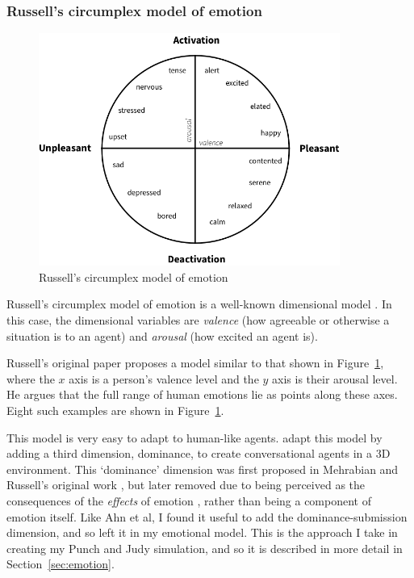 \documentclass[11pt]{report}
\begin{document}
\subsubsection{Russell's circumplex model of emotion}\label{sec:circumplex}
\begin{figure}[!t]
\centerline{\includegraphics[height=3in]{circumplex.png}}
\caption{Russell's circumplex model of emotion} \label{fig:circumplex}
\end{figure}

Russell's circumplex model of emotion is a well-known dimensional model \citep{russell1980circumplex}. In this case, the dimensional variables are \emph{valence} (how agreeable or otherwise a situation is to an agent) and \emph{arousal} (how excited an agent is).

Russell's original paper proposes a model similar to that shown in Figure~\ref{fig:circumplex}, where the $x$ axis is a person's valence level and the $y$ axis is their arousal level. He argues that the full range of human emotions lie as points along these axes. Eight such examples are shown in Figure~\ref{fig:circumplex}.

This model is very easy to adapt to human-like agents. \citet{ahn2012nvc} adapt this model by adding a third dimension, dominance, to create conversational agents in a 3D environment. This `dominance' dimension was first proposed in Mehrabian and Russell's original work \citep{mehrabian1974approach}, but later removed due to being perceived as the consequences of the \emph{effects\/} of emotion \citep{russell1980circumplex}, rather than being a component of emotion itself. Like Ahn et al, I found it useful to add the dominance-submission dimension, and so left it in my emotional model. This is the approach I take in creating my Punch and Judy simulation, and so it is described in more detail in Section~\ref{sec:emotion}.
\end{document}
